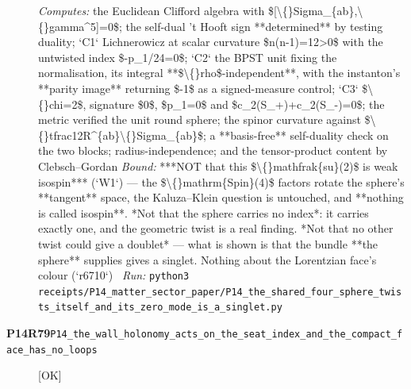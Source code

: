 \begin{description}
\emph{Computes:} the Euclidean Clifford algebra with \$[\textbackslash\{\}Sigma\_\{ab\},\textbackslash\{\}gamma\textasciicircum{}5]=0\$; the self-dual 't Hooft sign **determined** by testing duality; `C1` Lichnerowicz at scalar curvature \$n(n-1)=12>0\$ with the untwisted index \$-p\_1/24=0\$; `C2` the BPST unit fixing the normalisation, its integral **\$\textbackslash\{\}rho\$-independent**, with the instanton's **parity image** returning \$-1\$ as a signed-measure control; `C3` \$\textbackslash\{\}chi=2\$, signature \$0\$, \$p\_1=0\$ and \$c\_2(S\_+)+c\_2(S\_-)=0\$; the metric verified the unit round sphere; the spinor curvature against \$\textbackslash\{\}tfrac12R\textasciicircum{}\{ab\}\textbackslash\{\}Sigma\_\{ab\}\$; a **basis-free** self-duality check on the two blocks; radius-independence; and the tensor-product content by Clebsch--Gordan
 \emph{Bound:}  ***NOT that this \$\textbackslash\{\}mathfrak\{su\}(2)\$ is weak isospin*** (`W1`) --- the \$\textbackslash\{\}mathrm\{Spin\}(4)\$ factors rotate the sphere's **tangent** space, the Kaluza--Klein question is untouched, and **nothing is called isospin**. *Not that the sphere carries no index*: it carries exactly one, and the geometric twist is a real finding. *Not that no other twist could give a doublet* --- what is shown is that the bundle **the sphere** supplies gives a singlet. Nothing about the Lorentzian face's colour (`r6710`)
\ \emph{Run:} \texttt{python3 receipts/P14\_matter\_sector\_paper/P14\_the\_shared\_four\_sphere\_twists\_itself\_and\_its\_zero\_mode\_is\_a\_singlet.py}
\item[\rcptlabel{P14_the_wall_holonomy_acts_on_the_seat_index_and_the_compact_face_has_no_loops}{P14R79}\textbf{P14R79}\quad\texttt{P14\_the\_wall\_holonomy\_acts\_on\_the\_seat\_index\_and\_the\_compact\_face\_has\_no\_loops}]\hfill\textsf{[OK]}\\

\end{description}
